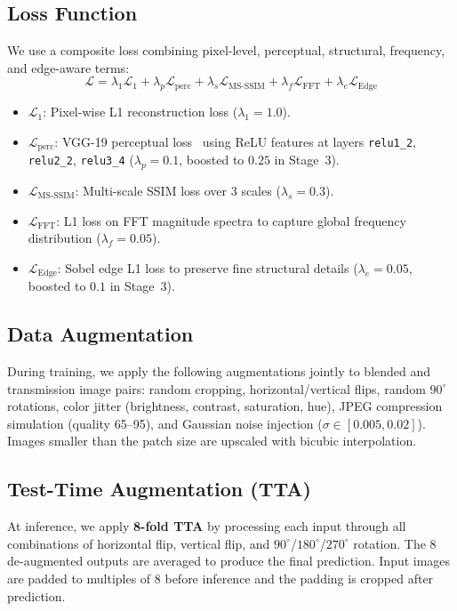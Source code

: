 \documentclass[10pt,twocolumn,letterpaper]{article}
\begin{document}
\subsection{Loss Function}

We use a composite loss combining pixel-level, perceptual, structural, frequency,
and edge-aware terms:
\begin{equation}
  \mathcal{L} = \lambda_1 \mathcal{L}_{1} + \lambda_p \mathcal{L}_{\text{perc}}
               + \lambda_s \mathcal{L}_{\text{MS-SSIM}}
               + \lambda_f \mathcal{L}_{\text{FFT}}
               + \lambda_e \mathcal{L}_{\text{Edge}}
\end{equation}

\begin{itemize}
  \item $\mathcal{L}_{1}$: Pixel-wise L1 reconstruction loss ($\lambda_1=1.0$).
  \item $\mathcal{L}_{\text{perc}}$: VGG-19 perceptual loss~\cite{johnson2016perceptual}
        using ReLU features at layers \texttt{relu1\_2}, \texttt{relu2\_2}, \texttt{relu3\_4}
        ($\lambda_p=0.1$, boosted to $0.25$ in Stage~3).
  \item $\mathcal{L}_{\text{MS-SSIM}}$: Multi-scale SSIM loss over 3 scales
        ($\lambda_s=0.3$).
  \item $\mathcal{L}_{\text{FFT}}$: L1 loss on FFT magnitude spectra
        to capture global frequency distribution ($\lambda_f=0.05$).
  \item $\mathcal{L}_{\text{Edge}}$: Sobel edge L1 loss to preserve
        fine structural details ($\lambda_e=0.05$, boosted to $0.1$ in Stage~3).
\end{itemize}

\subsection{Data Augmentation}

During training, we apply the following augmentations jointly to blended
and transmission image pairs:
random cropping, horizontal/vertical flips, random $90^\circ$ rotations,
color jitter (brightness, contrast, saturation, hue),
JPEG compression simulation (quality 65--95), and
Gaussian noise injection ($\sigma \in [0.005, 0.02]$).
Images smaller than the patch size are upscaled with bicubic interpolation.

\subsection{Test-Time Augmentation (TTA)}

At inference, we apply \textbf{8-fold TTA} by processing each input
through all combinations of horizontal flip, vertical flip, and
$90^\circ$/$180^\circ$/$270^\circ$ rotation.
The 8 de-augmented outputs are averaged to produce the final prediction.
Input images are padded to multiples of 8 before inference and the
padding is cropped after prediction.

{\small


}
\end{document}
